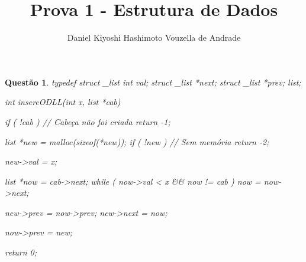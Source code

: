 \documentclass[12pt]{article}
\newenvironment{code}{\verbatim}{\endverbatim}
\newtheorem{ex}{Questão}
\begin{document}
\title{Prova 1 - Estrutura de Dados}
\author{Daniel Kiyoshi Hashimoto Vouzella de Andrade}
\date{}
\maketitle

\begin{ex}
	\begin{code}


    typedef struct _list {
        int val;
        struct _list *next;
        struct _list *prev;
    } list;
    
    int insereODLL(int x, list *cab) {
        if ( !cab ) // Cabeça não foi criada
            return -1;
        
        list *new = malloc(sizeof(*new));
        if ( !new ) // Sem memória
            return -2;

        new->val = x;
        
        list *now = cab->next;
        while ( now->val < x && now != cab )
            now = now->next;
        
        new->prev = now->prev;
        new->next = now;
        
        now->prev = new;
        
        return 0;
    }
	\end{code}
\end{ex}
\newpage
\end{document}
